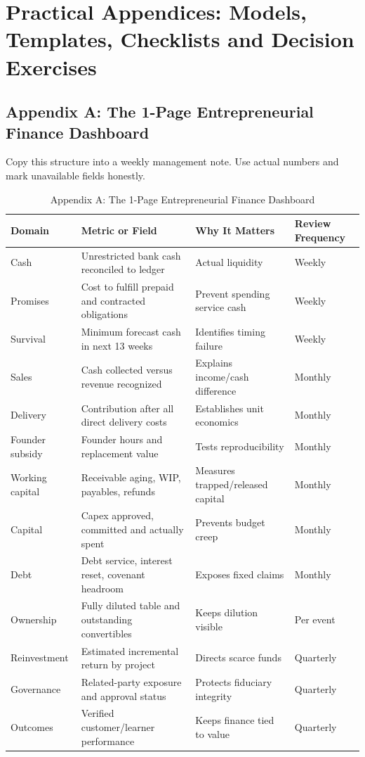 \section{Practical Appendices: Models, Templates, Checklists and Decision Exercises}

\subsection{Appendix A: The 1-Page Entrepreneurial Finance Dashboard}

Copy this structure into a weekly management note. Use actual numbers and mark unavailable fields honestly.

\begin{table}[t]
\centering
\small
\caption{Appendix A: The 1-Page Entrepreneurial Finance Dashboard}
\label{tab:app_a_dashboard}
\begin{tabularx}{\textwidth}{p{2.4cm} p{4.6cm} p{5.0cm} X}
\toprule
\textbf{Domain} & \textbf{Metric or Field} & \textbf{Why It Matters} & \textbf{Review Frequency} \\
\midrule
Cash & Unrestricted bank cash reconciled to ledger & Actual liquidity & Weekly \\
Promises & Cost to fulfill prepaid and contracted obligations & Prevent spending service cash & Weekly \\
Survival & Minimum forecast cash in next 13 weeks & Identifies timing failure & Weekly \\
Sales & Cash collected versus revenue recognized & Explains income/cash difference & Monthly \\
Delivery & Contribution after all direct delivery costs & Establishes unit economics & Monthly \\
Founder subsidy & Founder hours and replacement value & Tests reproducibility & Monthly \\
Working capital & Receivable aging, WIP, payables, refunds & Measures trapped/released capital & Monthly \\
Capital & Capex approved, committed and actually spent & Prevents budget creep & Monthly \\
Debt & Debt service, interest reset, covenant headroom & Exposes fixed claims & Monthly \\
Ownership & Fully diluted table and outstanding convertibles & Keeps dilution visible & Per event \\
Reinvestment & Estimated incremental return by project & Directs scarce funds & Quarterly \\
Governance & Related-party exposure and approval status & Protects fiduciary integrity & Quarterly \\
Outcomes & Verified customer/learner performance & Keeps finance tied to value & Quarterly \\
\bottomrule
\end{tabularx}
\end{table}

